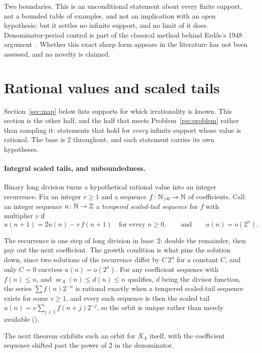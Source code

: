 \documentclass[11pt]{article}
\newcommand{\scA}{\operatorname{sc}}
\begin{document}
Two boundaries.  This is an unconditional statement about every finite
support, not a bounded table of examples, and not an implication with an open
hypothesis; but it settles no infinite support, and no limit of it does.
Denominator-period control is part of the classical method behind
Erd\H{o}s's 1948 argument~\cite{erdos1948}.  Whether this exact sharp form
appears in the literature has not been assessed, and no novelty is claimed.

\section{Rational values and scaled tails}\label{sec:forced}

Section~\ref{sec:map} below lists supports for which irrationality is known.
This section is the other half, and the half that meets
Problem~\ref{res:problem} rather than sampling it: statements that hold for
\emph{every} infinite support whose value is rational.  The base is $2$
throughout, and each statement carries its own hypotheses.

\paragraph{Integral scaled tails, and unboundedness.}
Binary long division turns a hypothetical rational value into an integer
recurrence.  Fix an integer $v\ge1$ and a sequence $f\colon\mathbb{N}_{>0}\to\mathbb{N}$ of
coefficients.  Call an integer sequence $u\colon\mathbb{N}\to\mathbb{Z}$ a
\emph{tempered scaled-tail sequence} for $f$ with multiplier $v$ if
\[
  u(n+1)=2u(n)-v\,f(n+1)\quad\text{for every }n\ge0,
  \qquad\text{and}\qquad u(n)=o(2^{n}).
\]

The recurrence is one step of long division in base~$2$: double the remainder,
then pay out the next coefficient.  The growth condition is what pins the
solution down, since two solutions of the recurrence differ by $C\,2^{n}$ for a
constant $C$, and only $C=0$ survives $u(n)=o(2^{n})$.  For any coefficient
sequence with $f(n)\le n$, and $\scA_A(n)\le d(n)\le n$ qualifies, $d$ being
the divisor function, the series $\sum f(n)2^{-n}$ is rational exactly when
a tempered scaled-tail sequence exists for some $v\ge1$, and every such
sequence is then
the scaled tail
$u(n)=v\sum_{j\ge1}f(n+j)2^{-j}$, so the orbit is unique rather than merely
available
().

The next theorem exhibits such an orbit for $X_A$ itself, with the coefficient
sequence shifted past the power of $2$ in the denominator.
\end{document}
